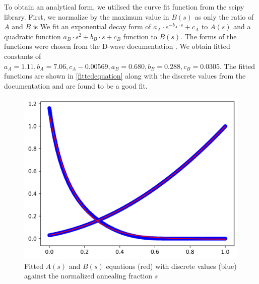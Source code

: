 To obtain an analytical form, we utilised the curve fit function from the scipy library. First, we normalize by the maximum value in $B(s)$ as only the ratio of $A$ and $B$ is We fit an exponential decay form of $a_{A}\cdot e^{-b_{A}\cdot s} + c_{A}$ to $A(s)$ and a quadratic function $a_{B} \cdot s^2 + b_{B} \cdot s + c_{B}$ function to $B(s)$. The forms of the functions were chosen from the D-wave documentation \cite{dwavefunctions}. We obtain fitted constants of $a_{A}=1.11, b_{A} = 7.06, c_A-0.00569, a_B = 0.680, b_B = 0.288, c_B = 0.0305$. The fitted functions are shown in \autoref{fittedequation} along with the discrete values from the documentation and are found to be a good fit.
\begin{figure}[!h]
    \centering
    \includegraphics[width=0.8\linewidth]{images/fitted.png}
    \caption{Fitted $A(s)$ and $B(s)$ equations (red) with discrete values (blue) against the normalized annealing fraction $s$}
    \label{fittedequation}
\end{figure}